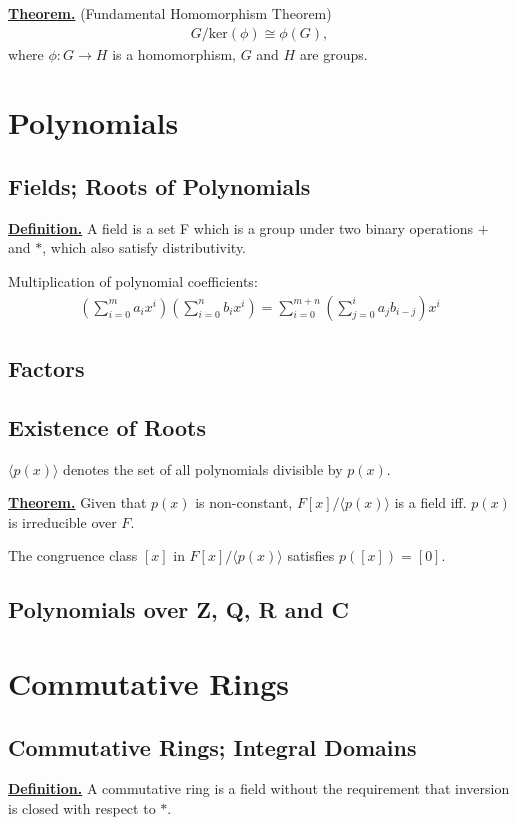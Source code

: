 \documentclass{article}
\renewcommand\({\left(}
\renewcommand\){\right)}
\begin{document}
\vspace{6mm}
\underline{\textbf{Theorem.}} (Fundamental Homomorphism Theorem) 
\begin{align*}
    G/\text{ker}(\phi)\cong\phi(G),
\end{align*}
where $\phi:G\rightarrow H$ is a homomorphism, $G$ and $H$ are groups. 
\newpage

\section{Polynomials}
\subsection{Fields; Roots of Polynomials}
\underline{\textbf{Definition.}} A field is a set F which is a group under two binary operations $+$ and $*$, which also satisfy distributivity.

\vspace{6mm}
Multiplication of polynomial coefficients:
\begin{align*}
    \left(\sum_{i=0}^{m}a_ix^i\right)\left(\sum_{i=0}^{n}b_ix^i\right)=\sum_{i=0}^{m+n}\left(\sum_{j=0}^{i}a_jb_{i-j}\right)x^i
\end{align*}
\subsection{Factors}
\subsection{Existence of Roots}
$\langle p(x)\rangle$ denotes the set of all polynomials divisible by $p(x)$. 

\vspace{6mm}
\underline{\textbf{Theorem.}} Given that $p(x)$ is non-constant, $F[x]/\langle p(x)\rangle$ is a field iff. $p(x)$ is irreducible over $F$.

\vspace{6mm}
The congruence class $[x]$ in $F[x]/\langle p(x)\rangle$ satisfies $p([x])=[0]$.
\subsection{Polynomials over Z, Q, R and C}

\newpage
\section{Commutative Rings}
\subsection{Commutative Rings; Integral Domains}
\underline{\textbf{Definition.}} A commutative ring is a field without the requirement that inversion is closed with respect to $*$.
\end{document}

